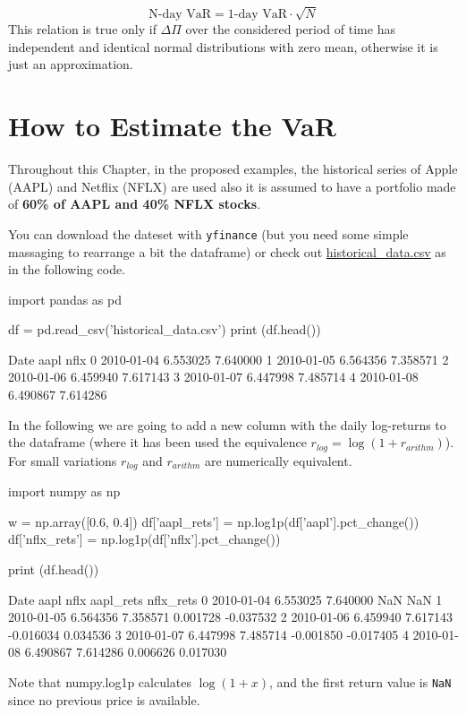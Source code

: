\begin{equation}
\textrm{N-day VaR} = \textrm{1-day VaR}\cdot \sqrt{N}
\label{eq:var_horizon}
\end{equation}
This relation is true only if $\Delta\Pi$ over the considered period of time has independent and identical normal distributions with zero mean, otherwise it is just an approximation.

\section{How to Estimate the VaR}
\label{how-to-estimate-the-var}

Throughout this Chapter, in the proposed examples, the historical series of Apple (AAPL) and Netflix (NFLX) are used also it is assumed to have a portfolio made of \textbf{60\% of AAPL and 40\% NFLX stocks}.
 
You can download the dateset with \texttt{yfinance} (but you need some simple massaging to rearrange a bit the dataframe) or check out \href{https://raw.githubusercontent.com/matteosan1/finance_course/develop/libro/input_files/historical_data.csv}{historical\_data.csv} as in the following code.

\begin{ipython}
import pandas as pd

df = pd.read_csv('historical_data.csv')	
print (df.head())
\end{ipython}
\begin{ioutput}
         Date      aapl      nflx
0  2010-01-04  6.553025  7.640000
1  2010-01-05  6.564356  7.358571
2  2010-01-06  6.459940  7.617143
3  2010-01-07  6.447998  7.485714
4  2010-01-08  6.490867  7.614286
\end{ioutput}
\noindent
In the following we are going to add a new column with the daily log-returns to the dataframe (where it has been used the equivalence $r_{log} = \log(1+r_{arithm})$). For small variations $r_{log}$ and $r_{arithm}$ are numerically equivalent.

\begin{ipython}
import numpy as np

w = np.array([0.6, 0.4])
df['aapl_rets'] = np.log1p(df['aapl'].pct_change())
df['nflx_rets'] = np.log1p(df['nflx'].pct_change())

print (df.head())
\end{ipython}
\begin{ioutput}
         Date      aapl      nflx  aapl_rets  nflx_rets
0  2010-01-04  6.553025  7.640000        NaN        NaN
1  2010-01-05  6.564356  7.358571   0.001728  -0.037532
2  2010-01-06  6.459940  7.617143  -0.016034   0.034536
3  2010-01-07  6.447998  7.485714  -0.001850  -0.017405
4  2010-01-08  6.490867  7.614286   0.006626   0.017030
\end{ioutput}
Note that \textrm{numpy.log1p} calculates $\log(1 + x)$, and the first return value is \texttt{NaN} since no previous price is available.

